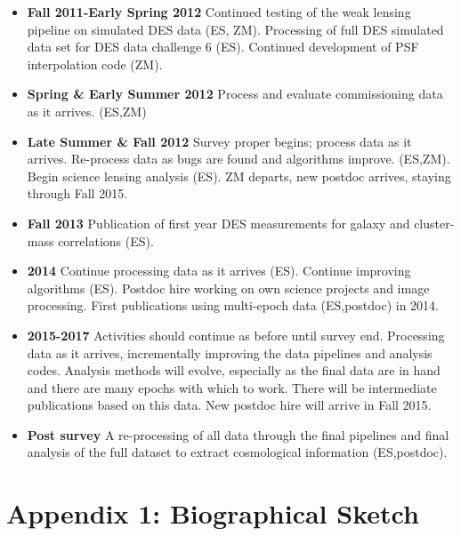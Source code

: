 \documentclass[12pt]{article}
\begin{document}
\begin{itemize}

\item {\bf Fall 2011-Early Spring 2012} Continued testing of the weak lensing
pipeline on simulated DES data (ES, ZM).  Processing of full DES
simulated data set for DES data challenge 6 (ES).     Continued development of
PSF interpolation code (ZM).

\item {\bf Spring \& Early Summer 2012} Process and evaluate commissioning data
as it arrives.  (ES,ZM)

\item {\bf Late Summer \& Fall 2012} Survey proper begins; process data as it
arrives.  Re-process data as bugs are found and algorithms improve. (ES,ZM).
Begin science lensing analysis (ES).  ZM departs, new postdoc arrives, staying
through Fall 2015.

\item {\bf Fall 2013} Publication of first year DES measurements for
galaxy and cluster-mass correlations (ES).  

\item {\bf 2014} Continue processing data as it arrives (ES).  Continue
improving algorithms (ES).  Postdoc hire working on own science projects and
image processing.  First publications using multi-epoch data (ES,postdoc) in
2014.

\item {\bf 2015-2017}  Activities should continue as before until survey end.
Processing data as it arrives, incrementally improving the data pipelines and
analysis codes.  Analysis methods will evolve, especially as the final data are
in hand and there are many epochs with which to work.   There will be
intermediate publications based on this data.  New postdoc hire will arrive
in Fall 2015.

\item {\bf Post survey} A re-processing of all data through the final pipelines
and final analysis of the full dataset to extract cosmological information (ES,postdoc).


\end{itemize}







\newpage
{}
\section*{Appendix 1: Biographical Sketch}
\end{document}
